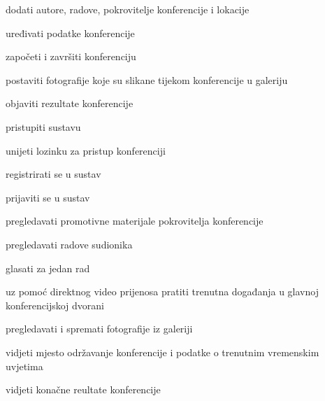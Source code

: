 			
			\begin{packed_enum}
				\item  {}
				
				\begin{packed_enum}
					
					\item dodati autore, radove, pokrovitelje konferencije i lokacije
					\item uređivati podatke konferencije
					\item započeti i završiti konferenciju
					\item postaviti fotografije koje su slikane tijekom konferencije u galeriju
					\item objaviti rezultate konferencije
					
				\end{packed_enum}
			
				\item  {}
				
				\begin{packed_enum}
					
					\item pristupiti sustavu
					\item unijeti lozinku za pristup konferenciji
					\item registrirati se u sustav
					
				\end{packed_enum}
				
				\item  {}
				
				\begin{packed_enum}
					
					\item prijaviti se u sustav
					\item pregledavati promotivne materijale pokrovitelja konferencije
					\item pregledavati radove sudionika
					\item glasati za jedan rad
					\item uz pomoć direktnog video prijenosa pratiti trenutna događanja u glavnoj konferencijskoj dvorani
					\item pregledavati i spremati fotografije iz galeriji
					\item vidjeti mjesto održavanje konferencije i podatke o trenutnim vremenskim uvjetima
					\item vidjeti konačne reultate konferencije
					

\end{packed_enum}
\end{packed_enum}
